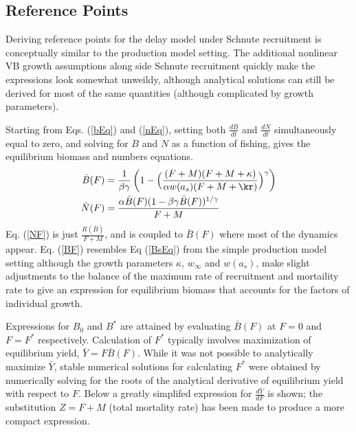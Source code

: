 %

%


%
\subsection{Reference Points}

%
Deriving reference points for the delay model under Schnute recruitment is 
conceptually similar to the production model setting. The additional nonlinear 
VB growth assumptions along side Schnute recruitment quickly make the 
expressions look somewhat unweildy, although analytical solutions can still be 
derived for most of the same quantities (although complicated by growth parameters).

%
Starting from Eqs. (\ref{bEq}) and (\ref{nEq}), setting both $\frac{dB}{dt}$ 
and $\frac{dN}{dt}$ simultaneously equal to zero, and solving for $B$ and $N$ 
as a function of fishing, gives the equilibrium biomass and numbers equations.
%
\begin{align}
\bar{B}(F) &= \frac{1}{\beta\gamma} \left( 1 - \Big(\frac{(F + M) (F + M + \kappa)}{\alpha w(a_s)(F + M + \kr)}\Big)^\gamma\right) \label{BF}\\
\bar{N}(F) &= \frac{\alpha\bar{B}(F)(1-\beta\gamma\bar{B}(F))^{1/\gamma}}{F+M} \label{NF}
\end{align}
%
Eq. (\ref{NF}) is just $\frac{R(\bar{B})}{F+M}$, and is coupled to $\bar{B}(F)$ 
where most of the dynamics appear. Eq. (\ref{BF}) resembles Eq (\ref{BsEq}) 
from the simple production model setting although the growth parameters 
$\kappa$, $w_\infty$ and $w(a_s)$, make slight adjustments to the balance of the 
maximum rate of recruitment and mortaility rate to give an expression for 
equilibrium biomass that accounts for the factors of individual growth.

%
Expressions for $B_0$ and $B^*$ are attained by evaluating $\bar{B}(F)$ at 
$F=0$ and $F=F^*$ respectively. Calculation of $F^*$ typically involves %
maximization of equilibrium yield, \mbox{$\bar{Y} = F\bar{B}(F)$.} While it was not 
possible to analytically maximize $\bar{Y}$, stable numerical solutions for 
calculating $F^*$ were obtained by numerically solving for the roots of the 
analytical derivative of equilibrium yield with respect to $F$. Below a greatly
simplifed expression for $\frac{d \bar{Y}}{dF}$ is shown; the substitution 
$Z=F+M$ (total mortality rate) has been made to produce a more compact expression.
 
